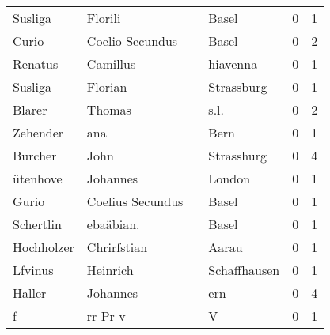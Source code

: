 \begin{center}
\begin{tiny}
\begin{longtabu}{llllrr}
                  Susliga &                            Florili &             &                                       Basel &          0 &         1 \\
                    Curio &                    Coelio Secundus &             &                                       Basel &          0 &         2 \\
                  Renatus &                           Camillus &             &                                    hiavenna &          0 &         1 \\
                  Susliga &                            Florian &             &                                  Strassburg &          0 &         1 \\
                   Blarer &                             Thomas &             &                                        s.l. &          0 &         2 \\
                 Zehender &                                ana &             &                                        Bern &          0 &         1 \\
                  Burcher &                               John &             &                                  Strasshurg &          0 &         4 \\
                 ütenhove &                           Johannes &             &                                      London &          0 &         1 \\
                    Gurio &                   Coelius Secundus &             &                                       Basel &          0 &         1 \\
                Schertlin &                          ebaäbian. &             &                                       Basel &          0 &         1 \\
               Hochholzer &                        Chrirfstian &             &                                       Aarau &          0 &         1 \\
                  Lfvinus &                           Heinrich &             &                                Schaffhausen &          0 &         1 \\
                   Haller &                           Johannes &             &                                         ern &          0 &         4 \\
                        f &                            rr Pr v &             &                                           V &          0 &         1 \\

\end{longtabu}
\end{tiny}
\end{center}
